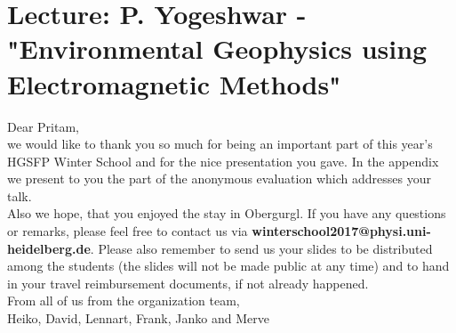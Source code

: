 \documentclass[11pt,a4paper]{article}
\begin{document}
\section*{Lecture: P. Yogeshwar - "Environmental Geophysics using Electromagnetic Methods"}

Dear Pritam,\\
we would like to thank you so much for being an important part of this year's HGSFP Winter School and for the nice presentation you gave.
In the appendix we present to you the part of the anonymous evaluation which addresses your talk.\\
Also we hope, that you enjoyed the stay in Obergurgl. If you have any questions or remarks, please feel free to contact us via \textbf{winterschool2017@physi.uni-heidelberg.de}. Please also remember to send us your slides to be distributed among the students (the slides will not be made public at any time) and to hand in your travel reimbursement documents, if not already happened.\\
From all of us from the organization team,\\
Heiko, David, Lennart, Frank, Janko and Merve
\end{document}
